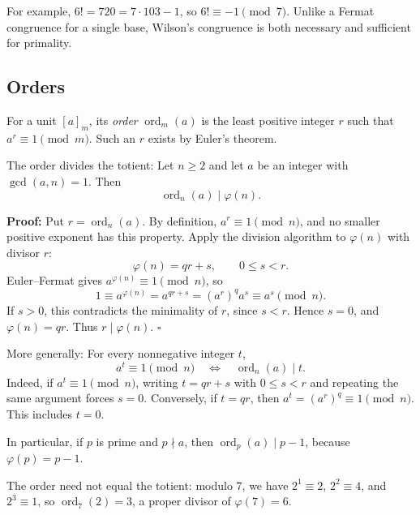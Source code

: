\documentclass[a4paper,11pt,abstracton]{scrartcl}
\theoremstyle{dotlessP}
\theoremstyle{dotlessS}
\theoremstyle{remark}
\theoremstyle{definition}
\begin{document}
\begin{example_box}
For example, $6!=720=7\cdot103-1$, so $6!\equiv-1\pmod7$.
Unlike a Fermat congruence for a single base, Wilson's congruence is
both necessary and sufficient for primality.
\end{example_box}


\subsection{Orders}

\begin{definition_box}
For a unit $[a]_m$, its \emph{order}
$\operatorname{ord}_m(a)$ is the least positive integer $r$ such that
$a^r\equiv1\pmod m$. Such an $r$ exists by Euler's theorem.
\end{definition_box}


\begin{mainbox}{The order divides the totient:}
Let $n\geq2$ and let $a$ be an integer with $\gcd(a,n)=1$. Then
\[
    \boxed{\operatorname{ord}_n(a)\mid\varphi(n).}
\]
\end{mainbox}

\textbf{Proof:}
Put $r=\operatorname{ord}_n(a)$. By definition, $a^r\equiv1\pmod n$,
and no smaller positive exponent has this property.
Apply the division algorithm to $\varphi(n)$ with divisor $r$:
\[
    \varphi(n)=qr+s,\qquad 0\leq s<r.
\]
Euler--Fermat gives $a^{\varphi(n)}\equiv1\pmod n$, so
\[
    1\equiv a^{\varphi(n)}=a^{qr+s}
      =(a^r)^qa^s\equiv a^s\pmod n.
\]
If $s>0$, this contradicts the minimality of $r$, since $s<r$.
Hence $s=0$, and $\varphi(n)=qr$. Thus $r\mid\varphi(n)$.
\hfill$\square$


\begin{mainbox}{More generally:}
For every nonnegative integer $t$,
\[
    a^t\equiv1\pmod n
    \quad\Longleftrightarrow\quad \operatorname{ord}_n(a)\mid t.
\]
Indeed, if $a^t\equiv1\pmod n$, writing $t=qr+s$ with $0\leq s<r$
and repeating the same argument forces $s=0$.
Conversely, if $t=qr$, then $a^t=(a^r)^q\equiv1\pmod n$.
This includes $t=0$.

In particular, if $p$ is prime and $p\nmid a$, then
$\operatorname{ord}_p(a)\mid p-1$, because $\varphi(p)=p-1$.
\end{mainbox}

\begin{example_box}
The order need not equal the totient: modulo $7$, we have
$2^1\equiv2$, $2^2\equiv4$, and $2^3\equiv1$, so
$\operatorname{ord}_7(2)=3$, a proper divisor of $\varphi(7)=6$.
\end{example_box}
\end{document}
